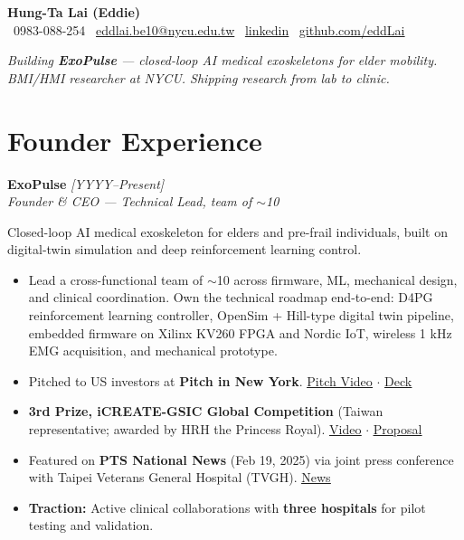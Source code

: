 \documentclass[10pt,a4paper]{article}
\newcommand{\role}[3]{\textbf{#1} \hfill \textit{#2} \\ \textit{#3}}
\newcommand{\link}[2]{\href{#1}{\underline{#2}}}
\begin{document}
\begin{center}
    {\Huge\bfseries Hung-Ta Lai (Eddie)}\\[4pt]
    \small
    \faPhone\ 0983-088-254 \quad
    \faEnvelope\ \href{mailto:eddlai.be10@nycu.edu.tw}{eddlai.be10@nycu.edu.tw} \quad
    \faLinkedin\ \link{https://linkedin.com/in/YOUR-HANDLE}{linkedin} \quad
    \faGithub\ \link{https://github.com/eddLai}{github.com/eddLai}
\end{center}

\begin{center}
    \textit{Building \textbf{ExoPulse} — closed-loop AI medical exoskeletons for elder mobility.\\
    BMI/HMI researcher at NYCU. Shipping research from lab to clinic.}
\end{center}

\section*{Founder Experience}

\role{ExoPulse}{[YYYY--Present]}{Founder \& CEO --- Technical Lead, team of $\sim$10}

\vspace{2pt}
Closed-loop AI medical exoskeleton for elders and pre-frail individuals,
built on digital-twin simulation and deep reinforcement learning control.

\begin{itemize}
    \item Lead a cross-functional team of $\sim$10 across firmware, ML, mechanical
    design, and clinical coordination. Own the technical roadmap end-to-end:
    D4PG reinforcement learning controller,
    OpenSim + Hill-type digital twin pipeline, embedded firmware on Xilinx KV260 FPGA
    and Nordic IoT, wireless 1 kHz EMG acquisition, and mechanical prototype.
    \item Pitched to US investors at \textbf{Pitch in New York}.
    \link{https://YOUR-PITCH-VIDEO}{Pitch Video} $\cdot$
    \link{https://YOUR-DECK}{Deck}
    \item \textbf{3rd Prize, iCREATE-GSIC Global Competition} (Taiwan representative;
    awarded by HRH the Princess Royal).
    \link{https://YOUR-VIDEO}{Video} $\cdot$
    \link{https://YOUR-PROPOSAL}{Proposal}
    \item Featured on \textbf{PTS National News} (Feb 19, 2025) via joint press
    conference with Taipei Veterans General Hospital (TVGH).
    \link{https://YOUR-NEWS-LINK}{News}
    \item \textbf{Traction:} Active clinical collaborations with \textbf{three hospitals}
    for pilot testing and validation.
\end{itemize}
\end{document}
